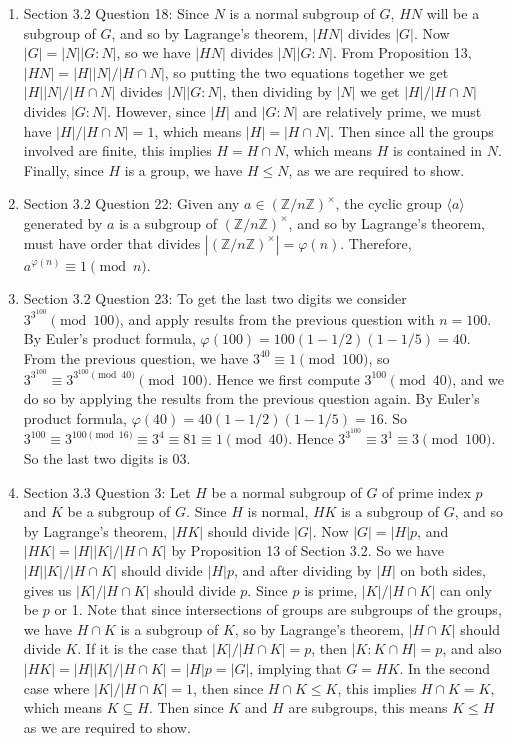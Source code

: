 \documentclass{article}
\begin{document}
\begin{enumerate}
  \item Section 3.2 Question 18: Since $N$ is a normal subgroup of $G$,
    $HN$ will be a subgroup of $G$, and so by Lagrange's theorem, $|HN|$
    divides $|G|$. Now $|G|=|N||G:N|$, so we have $|HN|$ divides
    $|N||G:N|$. From Proposition 13, $|HN|=|H||N|/|H\cap N|$, so putting
    the two equations together we get $|H||N|/|H\cap N|$ divides
    $|N||G:N|$, then dividing by $|N|$ we get $|H|/|H\cap N|$ divides
    $|G:N|$. However, since $|H|$ and $|G:N|$ are relatively prime, we must
    have $|H|/|H\cap N|=1$, which means $|H|=|H\cap N|$. Then since all the
    groups involved are finite, this implies $H=H\cap N$, which means $H$
    is contained in $N$. Finally, since $H$ is a group, we have $H\leq N$,
    as we are required to show.

  \item Section 3.2 Question 22: Given any
    $a\in(\mathbb{Z}/n\mathbb{Z})^\times$, the cyclic group $\langle
    a\rangle$ generated by $a$ is a subgroup of
    $(\mathbb{Z}/n\mathbb{Z})^\times$, and so by Lagrange's theorem, must
    have order that divides $|(\mathbb{Z}/n\mathbb{Z})^\times|=\varphi(n)$.
    Therefore, $a^{\varphi(n)}\equiv 1\pmod{n}$.

  \item Section 3.2 Question 23: To get the last two digits we consider
    $3^{3^{100}}\pmod{100}$, and apply results from the previous question
    with $n=100$. By Euler's product formula,
    $\varphi(100)=100(1-1/2)(1-1/5)=40$. From the previous question, we
    have $3^{40}\equiv1\pmod{100}$, so
    $3^{3^{100}}\equiv3^{3^{100}\pmod{40}}\pmod{100}$. Hence we first
    compute $3^{100}\pmod{40}$, and we do so by applying the results from
    the previous question again. By Euler's product formula,
    $\varphi(40)=40(1-1/2)(1-1/5)=16$. So
    $3^{100}\equiv3^{100\pmod{16}}\equiv3^4\equiv81\equiv1\pmod{40}$. Hence
    $3^{3^{100}}\equiv3^{1}\equiv3\pmod{100}$. So the last two digits is
    03.

  \item Section 3.3 Question 3: Let $H$ be a normal subgroup of $G$ of
    prime index $p$ and $K$ be a subgroup of $G$. Since $H$ is normal, $HK$
    is a subgroup of $G$, and so by Lagrange's theorem, $|HK|$ should
    divide $|G|$. Now $|G|=|H|p$, and
    $|HK|=|H||K|/|H\cap K|$ by Proposition 13 of Section 3.2. So we have
    $|H||K|/|H\cap K|$ should divide $|H|p$, and after dividing by $|H|$ on
    both sides, gives us $|K|/|H\cap K|$ should divide $p$. Since $p$ is
    prime, $|K|/|H\cap K|$ can only be $p$ or 1. Note that since
    intersections of groups are subgroups of the groups, we have $H\cap K$
    is a subgroup of $K$, so by Lagrange's theorem, $|H\cap K|$ should
    divide $K$. If it is the case that $|K|/|H\cap K|=p$, then $|K:K\cap
    H|=p$, and also $|HK|=|H||K|/|H\cap K|=|H|p=|G|$, implying that $G=HK$.
    In the second case where $|K|/|H\cap K|=1$, then since $H\cap K\leq K$,
    this implies $H\cap K=K$, which means $K\subseteq H$. Then since $K$
    and $H$ are subgroups, this means $K\leq H$ as we are required to show.
\end{enumerate}
\end{document}
